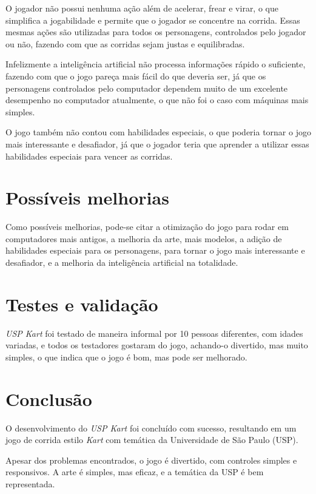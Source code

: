 O jogador não possui nenhuma ação além de acelerar, frear e virar, o que simplifica a jogabilidade e permite que o jogador se concentre na corrida. Essas mesmas ações são utilizadas para todos os personagens, controlados pelo jogador ou não, fazendo com que as corridas sejam justas e equilibradas.

Infelizmente a inteligência artificial não processa informações rápido o suficiente, fazendo com que o jogo pareça mais fácil do que deveria ser, já que os personagens controlados pelo computador dependem muito de um excelente desempenho no computador atualmente, o que não foi o caso com máquinas mais simples.

O jogo também não contou com habilidades especiais, o que poderia tornar o jogo mais interessante e desafiador, já que o jogador teria que aprender a utilizar essas habilidades especiais para vencer as corridas.

\section{Possíveis melhorias}

Como possíveis melhorias, pode-se citar a otimização do jogo para rodar em computadores mais antigos, a melhoria da arte, mais modelos, a adição de habilidades especiais para os personagens, para tornar o jogo mais interessante e desafiador, e a melhoria da inteligência artificial na totalidade.

\section{Testes e validação}

\textit{USP Kart} foi testado de maneira informal por 10 pessoas diferentes, com idades variadas, e todos os testadores gostaram do jogo, achando-o divertido, mas muito simples, o que indica que o jogo é bom, mas pode ser melhorado.

\section{Conclusão}

O desenvolvimento do \textit{USP Kart} foi concluído com sucesso, resultando em um jogo de corrida estilo \textit{Kart} com temática da Universidade de São Paulo (USP).

Apesar dos problemas encontrados, o jogo é divertido, com controles simples e responsivos. A arte é simples, mas eficaz, e a temática da USP é bem representada.

